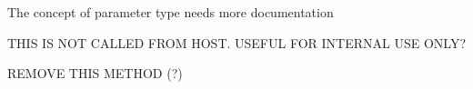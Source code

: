 \begin{DoxyRefList}
%
The concept of parameter type needs more documentation 
\item[Member \mbox{\hyperlink{class_a_a_x___i_a_c_f_effect_parameters_a333b83bc6f37b0103ce0de65be02fede}{A\+A\+X\+\_\+\+I\+A\+C\+F\+Effect\+Parameters::Set\+Parameter\+Default\+Normalized\+Value}} (A\+A\+X\+\_\+\+C\+Param\+ID i\+Parameter\+ID, double i\+Value)=0]\label{todo__todo000038}%
%
T\+H\+IS IS N\+OT C\+A\+L\+L\+ED F\+R\+OM H\+O\+ST. U\+S\+E\+F\+UL F\+OR I\+N\+T\+E\+R\+N\+AL U\+SE O\+N\+LY? 
\item[Member \mbox{\hyperlink{class_a_a_x___i_a_c_f_effect_parameters_a6e28a427a0d7d0c8df69dd5eb88cff6c}{A\+A\+X\+\_\+\+I\+A\+C\+F\+Effect\+Parameters::Set\+Parameter\+Normalized\+Relative}} (A\+A\+X\+\_\+\+C\+Param\+ID i\+Parameter\+ID, double i\+Value)=0]\label{todo__todo000041}%
%
R\+E\+M\+O\+VE T\+H\+IS M\+E\+T\+H\+OD (?)


\end{DoxyRefList}

